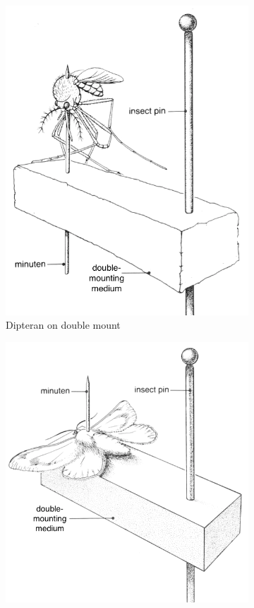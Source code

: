 \documentclass[letterpaper, 11pt]{article}
\begin{document}
\begin{figure}[ht!]
    \centering
    \begin{subfigure}[ht!]{0.38\textwidth}
        \includegraphics[width=\textwidth]{doublemount}
        \caption{Dipteran on double mount \citep[modified from][Fig. 18A]{USDAmanual1986}}
        \label{fig:flymount}
    \end{subfigure}
    \qquad
    \begin{subfigure}[ht!]{0.42\textwidth}
        \includegraphics[width=\textwidth]{doublemountMoth}

\end{subfigure}
\end{figure}
\end{document}
